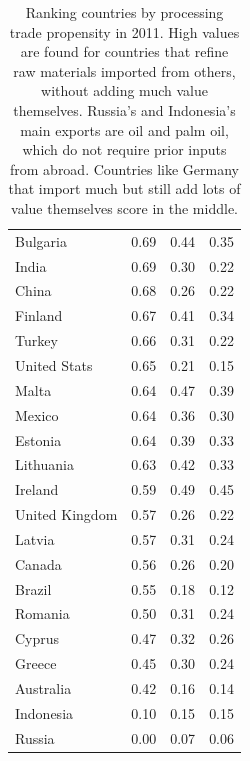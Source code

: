 \documentclass[english]{uzhpub}
\begin{document}
\begin{table}[]
\begin{tabular}{llll}
Bulgaria       & 0.69                        & 0.44                  & 0.35           \\
India          & 0.69                        & 0.30                  & 0.22           \\
China          & 0.68                        & 0.26                  & 0.22           \\
Finland        & 0.67                        & 0.41                  & 0.34           \\
Turkey         & 0.66                        & 0.31                  & 0.22           \\
United Stats   & 0.65                        & 0.21                  & 0.15           \\
Malta          & 0.64                        & 0.47                  & 0.39           \\
Mexico         & 0.64                        & 0.36                  & 0.30           \\
Estonia        & 0.64                        & 0.39                  & 0.33           \\
Lithuania      & 0.63                        & 0.42                  & 0.33           \\
Ireland        & 0.59                        & 0.49                  & 0.45           \\
United Kingdom & 0.57                        & 0.26                  & 0.22           \\
Latvia         & 0.57                        & 0.31                  & 0.24           \\
Canada         & 0.56                        & 0.26                  & 0.20           \\
Brazil         & 0.55                        & 0.18                  & 0.12           \\
Romania        & 0.50                        & 0.31                  & 0.24           \\
Cyprus         & 0.47                        & 0.32                  & 0.26           \\
Greece         & 0.45                        & 0.30                  & 0.24           \\
Australia      & 0.42                        & 0.16                  & 0.14           \\
Indonesia      & 0.10                        & 0.15                  & 0.15           \\
Russia         & 0.00                        & 0.07                  & 0.06          
\end{tabular}
\caption{Ranking countries by processing trade propensity in 2011. High values are found for countries that refine raw materials imported from others, without adding much value themselves. Russia's and Indonesia's main exports are oil and palm oil, which do not require prior inputs from abroad. Countries like Germany that import much but still add lots of value themselves score in the middle.} \label{tab:ranking}
\end{table}
\end{document}
